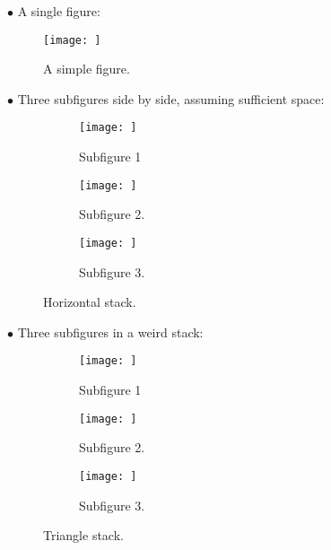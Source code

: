 \documentclass[11pt,oneside]{article}
\begin{document}
 

$\bullet$ A single figure:

\begin{figure}[!htp]
    \centering
    \texttt{[image: ]} %
    \caption{A simple figure.}
\end{figure}    

\vspace{0.8cm}

$\bullet$ Three subfigures side by side, assuming sufficient space:

\begin{figure}[!htp]
    \centering
    \begin{subfigure}{0.3\linewidth}
    \texttt{[image: ]} %
    \caption{Subfigure 1}
    \end{subfigure}\hfil
    \begin{subfigure}{0.3\linewidth}
    \texttt{[image: ]} %
    \caption{Subfigure 2.}
    \end{subfigure}\hfil
    \begin{subfigure}{0.3\linewidth}
    \texttt{[image: ]} %
    \caption{Subfigure 3.}
    \end{subfigure}
    
    \caption{Horizontal stack.}
\end{figure}

\vspace{0.8cm}
$ \bullet $ Three subfigures in a weird stack:

\begin{figure}[!htp]
    \centering
    \begin{subfigure}{0.45\linewidth}
    \texttt{[image: ]} %
    \caption{Subfigure 1}
    \end{subfigure}\hfil
    \begin{subfigure}{0.45\linewidth}
    \texttt{[image: ]} %
    \caption{Subfigure 2.}
    \end{subfigure}

    \smallskip
    \begin{subfigure}{0.45\linewidth}
    \texttt{[image: ]} %
    \caption{Subfigure 3.}
    \end{subfigure}
    
    \caption{Triangle stack.}
\end{figure}
\end{document}
